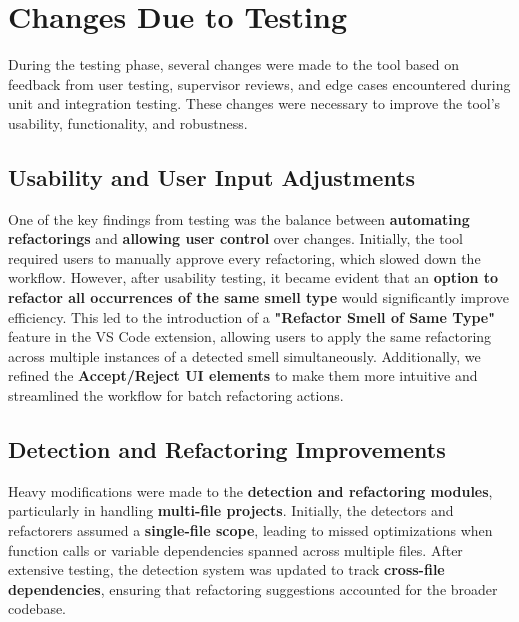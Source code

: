 \documentclass[12pt, titlepage]{article}
\begin{document}
\section{Changes Due to Testing}


During the testing phase, several changes were made to the tool based
on feedback from user testing, supervisor reviews, and edge cases
encountered during unit and integration testing. These changes were
necessary to improve the tool’s usability, functionality, and robustness.

\subsection{Usability and User Input Adjustments}
One of the key findings from testing was the balance between
\textbf{automating refactorings} and \textbf{allowing user control}
over changes. Initially, the tool required users to manually approve
every refactoring, which slowed down the workflow. However, after
usability testing, it became evident that an \textbf{option to
refactor all occurrences of the same smell type} would significantly
improve efficiency. This led to the introduction of a
\textbf{"Refactor Smell of Same Type"} feature in the VS Code
extension, allowing users to apply the same refactoring across
multiple instances of a detected smell simultaneously. Additionally,
we refined the \textbf{Accept/Reject UI elements} to make them more
intuitive and streamlined the workflow for batch refactoring actions.

\subsection{Detection and Refactoring Improvements}
Heavy modifications were made to the \textbf{detection and
refactoring modules}, particularly in handling \textbf{multi-file
projects}. Initially, the detectors and refactorers assumed a
\textbf{single-file scope}, leading to missed optimizations when
function calls or variable dependencies spanned across multiple
files. After extensive testing, the detection system was updated to
track \textbf{cross-file dependencies}, ensuring that refactoring
suggestions accounted for the broader codebase.
\end{document}
